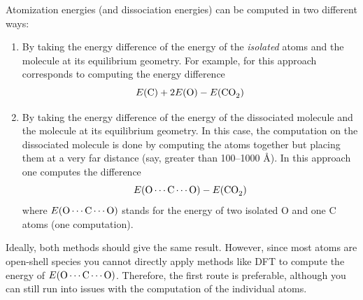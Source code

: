 \documentclass[../Main/chem371-notes.tex]{subfiles}
\begin{document}
Atomization energies (and dissociation energies) can be computed in two different ways:
\begin{enumerate}
\item By taking the energy difference of the energy of the \emph{isolated} atoms and the molecule at its equilibrium geometry. For example, for  this approach corresponds to computing the energy difference
\begin{equation}
E(\ce{C}) + 2 E(\ce{O}) - E(\ce{CO2})
\end{equation}
\item By taking the energy difference of the energy of the dissociated molecule and the molecule at its equilibrium geometry. In this case, the computation on the dissociated molecule is done by computing the atoms together but placing them at a very far distance (say, greater than 100--1000 \AA{}).
In this approach one computes the difference
\begin{equation}
E(\ce{O} \cdots \ce{C} \cdots \ce{O}) - E(\ce{CO2})
\end{equation}
where $E(\ce{O} \cdots \ce{C} \cdots \ce{O})$ stands for the energy of two isolated O and one C atoms (one computation).
\end{enumerate}
Ideally, both methods should give the same result. However, since most atoms are open-shell species you cannot directly apply methods like DFT to compute the energy of $E(\ce{O} \cdots \ce{C} \cdots \ce{O})$.
Therefore, the first route is preferable, although you can still run into issues with the computation of the individual atoms.
\end{document}
